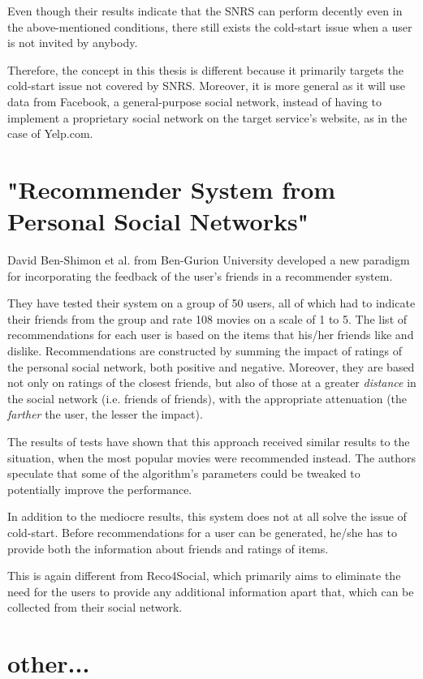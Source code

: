 \documentclass[12pt]{report}
\begin{document}
Even though their results indicate that the SNRS can perform decently even in the above-mentioned conditions, there still exists the cold-start issue when a user is not invited by anybody.

Therefore, the concept in this thesis is different because it primarily targets the cold-start issue not covered by SNRS. Moreover, it is more general as it will use data from Facebook, a general-purpose social network, instead of having to implement a proprietary social network on the target service's website, as in the case of Yelp.com.


\section{"Recommender System from Personal Social Networks"}

David Ben-Shimon et al. \cite{ben_gurion} from Ben-Gurion University developed a new paradigm for incorporating the feedback of the user's friends in a recommender system. 

They have tested their system on a group of 50 users, all of which had to indicate their friends from the group and rate 108 movies on a scale of 1 to 5. The list of recommendations for each user is based on the items that his/her friends like and dislike. Recommendations are constructed by summing the impact of ratings of the personal social network, both positive and negative. Moreover, they are based not only on ratings of the closest friends, but also of those at a greater \textit{distance} in the social network (i.e. friends of friends), with the appropriate attenuation (the \textit{farther} the user, the lesser the impact).

The results of tests have shown that this approach received similar results to the situation, when the most popular movies were recommended instead. The authors speculate that some of the algorithm's parameters could be tweaked to potentially improve the performance.

\hbox{}
In addition to the mediocre results, this system does not at all solve the issue of cold-start. Before recommendations for a user can be generated, he/she has to provide both the information about friends and ratings of items.

This is again different from Reco4Social, which primarily aims to eliminate the need for the users to provide any additional information apart that, which can be collected from their social network.


\section{other...}
\end{document}
